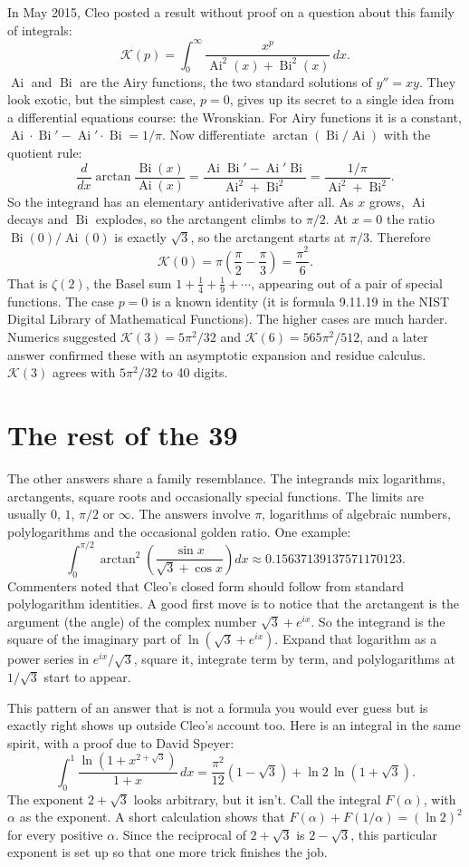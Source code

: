 \documentclass[11pt]{article}
\DeclareMathOperator{\Ai}{Ai}
\DeclareMathOperator{\Bi}{Bi}
\begin{document}
In May 2015, Cleo posted a result without proof on a question about this family of integrals:
\[
\mathcal K(p)=\int_0^\infty\frac{x^p}{\Ai^2(x)+\Bi^2(x)}\,dx.
\]
$\Ai$ and $\Bi$ are the Airy functions, the two standard solutions of $y''=xy$. They look exotic, but the simplest case, $p=0$, gives up its secret to a single idea from a differential equations course: the Wronskian. For Airy functions it is a constant, $\Ai\cdot\Bi'-\Ai'\cdot\Bi=1/\pi$. Now differentiate $\arctan(\Bi/\Ai)$ with the quotient rule:
\[
\frac{d}{dx}\arctan\frac{\Bi(x)}{\Ai(x)}=\frac{\Ai\Bi'-\Ai'\Bi}{\Ai^2+\Bi^2}=\frac{1/\pi}{\Ai^2+\Bi^2}.
\]
So the integrand has an elementary antiderivative after all. As $x$ grows, $\Ai$ decays and $\Bi$ explodes, so the arctangent climbs to $\pi/2$. At $x=0$ the ratio $\Bi(0)/\Ai(0)$ is exactly $\sqrt3$, so the arctangent starts at $\pi/3$. Therefore
\[
\mathcal K(0)=\pi\left(\frac{\pi}{2}-\frac{\pi}{3}\right)=\frac{\pi^2}{6}.
\]
That is $\zeta(2)$, the Basel sum $1+\frac14+\frac19+\cdots$, appearing out of a pair of special functions. The case $p=0$ is a known identity (it is formula 9.11.19 in the NIST Digital Library of Mathematical Functions). The higher cases are much harder. Numerics suggested $\mathcal K(3)=5\pi^2/32$ and $\mathcal K(6)=565\pi^2/512$, and a later answer confirmed these with an asymptotic expansion and residue calculus. $\mathcal K(3)$ agrees with $5\pi^2/32$ to 40 digits.

\section*{The rest of the 39}

The other answers share a family resemblance. The integrands mix logarithms, arctangents, square roots and occasionally special functions. The limits are usually $0$, $1$, $\pi/2$ or $\infty$. The answers involve $\pi$, logarithms of algebraic numbers, polylogarithms and the occasional golden ratio. One example:
\[
\int_0^{\pi/2}\arctan^2\!\left(\frac{\sin x}{\sqrt3+\cos x}\right)dx\approx 0.15637139137571170123.
\]
Commenters noted that Cleo's closed form should follow from standard polylogarithm identities. A good first move is to notice that the arctangent is the argument (the angle) of the complex number $\sqrt3+e^{ix}$. So the integrand is the square of the imaginary part of $\ln(\sqrt3+e^{ix})$. Expand that logarithm as a power series in $e^{ix}/\sqrt3$, square it, integrate term by term, and polylogarithms at $1/\sqrt3$ start to appear.

This pattern of an answer that is not a formula you would ever guess but is exactly right shows up outside Cleo's account too. Here is an integral in the same spirit, with a proof due to David Speyer:
\[
\int_0^1\frac{\ln\!\left(1+x^{2+\sqrt3}\right)}{1+x}\,dx=\frac{\pi^2}{12}\left(1-\sqrt3\right)+\ln2\,\ln\!\left(1+\sqrt3\right).
\]
The exponent $2+\sqrt3$ looks arbitrary, but it isn't. Call the integral $F(\alpha)$, with $\alpha$ as the exponent. A short calculation shows that $F(\alpha)+F(1/\alpha)=(\ln 2)^2$ for every positive $\alpha$. Since the reciprocal of $2+\sqrt3$ is $2-\sqrt3$, this particular exponent is set up so that one more trick finishes the job.
\end{document}
